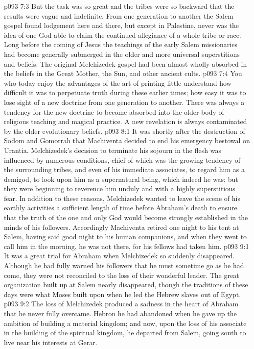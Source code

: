 \vs p093 7:3 But the task was so great and the tribes were so backward that the results were vague and indefinite. From one generation to another the Salem gospel found lodgement here and there, but except in Palestine, never was the idea of one God able to claim the continued allegiance of a whole tribe or race. Long before the coming of Jesus the teachings of the early Salem missionaries had become generally submerged in the older and more universal superstitions and beliefs. The original Melchizedek gospel had been almost wholly absorbed in the beliefs in the Great Mother, the Sun, and other ancient cults.
\vs p093 7:4 \pc You who today enjoy the advantages of the art of printing little understand how difficult it was to perpetuate truth during these earlier times; how easy it was to lose sight of a new doctrine from one generation to another. There was always a tendency for the new doctrine to become absorbed into the older body of religious teaching and magical practice. A new revelation is always contaminated by the older evolutionary beliefs.
\vs p093 8:1 It was shortly after the destruction of Sodom and Gomorrah that Machiventa decided to end his emergency bestowal on Urantia. Melchizedek’s decision to terminate his sojourn in the flesh was influenced by numerous conditions, chief of which was the growing tendency of the surrounding tribes, and even of his immediate associates, to regard him as a demigod, to look upon him as a supernatural being, which indeed he was; but they were beginning to reverence him unduly and with a highly superstitious fear. In addition to these reasons, Melchizedek wanted to leave the scene of his earthly activities a sufficient length of time before Abraham’s death to ensure that the truth of the one and only God would become strongly established in the minds of his followers. Accordingly Machiventa retired one night to his tent at Salem, having said good night to his human companions, and when they went to call him in the morning, he was not there, for his fellows had taken him.
\vs p093 9:1 It was a great trial for Abraham when Melchizedek so suddenly disappeared. Although he had fully warned his followers that he must sometime go as he had come, they were not reconciled to the loss of their wonderful leader. The great organization built up at Salem nearly disappeared, though the traditions of these days were what Moses built upon when he led the Hebrew slaves out of Egypt.
\vs p093 9:2 \pc The loss of Melchizedek produced a sadness in the heart of Abraham that he never fully overcame. Hebron he had abandoned when he gave up the ambition of building a material kingdom; and now, upon the loss of his associate in the building of the spiritual kingdom, he departed from Salem, going south to live near his interests at Gerar.
